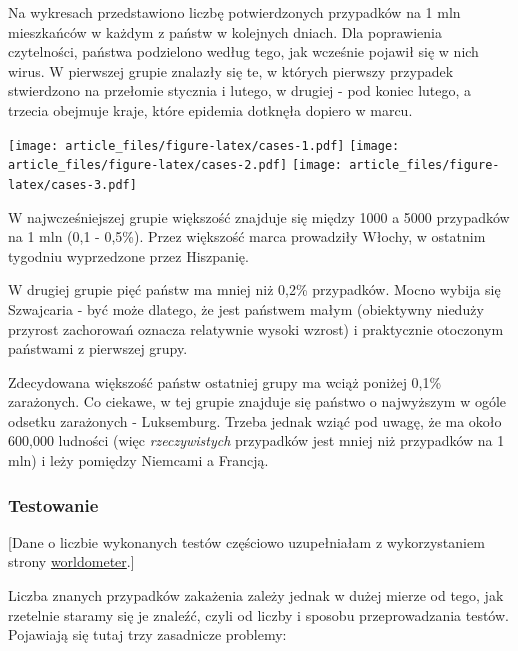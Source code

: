 \documentclass[
]{article}
\begin{document}
Na wykresach przedstawiono liczbę potwierdzonych przypadków na 1 mln
mieszkańców w każdym z państw w kolejnych dniach. Dla poprawienia
czytelności, państwa podzielono według tego, jak wcześnie pojawił się w
nich wirus. W pierwszej grupie znalazły się te, w których pierwszy
przypadek stwierdzono na przełomie stycznia i lutego, w drugiej - pod
koniec lutego, a trzecia obejmuje kraje, które epidemia dotknęła dopiero
w marcu.

\texttt{[image: article\_files/figure-latex/cases-1.pdf]}
\texttt{[image: article\_files/figure-latex/cases-2.pdf]}
\texttt{[image: article\_files/figure-latex/cases-3.pdf]}

W najwcześniejszej grupie większość znajduje się między 1000 a 5000
przypadków na 1 mln (0,1 - 0,5\%). Przez większość marca prowadziły
Włochy, w ostatnim tygodniu wyprzedzone przez Hiszpanię.

W drugiej grupie pięć państw ma mniej niż 0,2\% przypadków. Mocno wybija
się Szwajcaria - być może dlatego, że jest państwem małym (obiektywny
nieduży przyrost zachorowań oznacza relatywnie wysoki wzrost) i
praktycznie otoczonym państwami z pierwszej grupy.

Zdecydowana większość państw ostatniej grupy ma wciąż poniżej 0,1\%
zarażonych. Co ciekawe, w tej grupie znajduje się państwo o najwyższym w
ogóle odsetku zarażonych - Luksemburg. Trzeba jednak wziąć pod uwagę, że
ma około 600,000 ludności (więc \emph{rzeczywistych} przypadków jest
mniej niż przypadków na 1 mln) i leży pomiędzy Niemcami a Francją.

\hypertarget{testowanie}{%
\subsubsection{Testowanie}\label{testowanie}}

{[}Dane o liczbie wykonanych testów częściowo uzupełniałam z
wykorzystaniem strony
\href{worldometers.info/coronavirus/?utm_campaign=homeAdvegas1?}{worldometer}.{]}

Liczba znanych przypadków zakażenia zależy jednak w dużej mierze od
tego, jak rzetelnie staramy się je znaleźć, czyli od liczby i sposobu
przeprowadzania testów. Pojawiają się tutaj trzy zasadnicze problemy:
\end{document}
